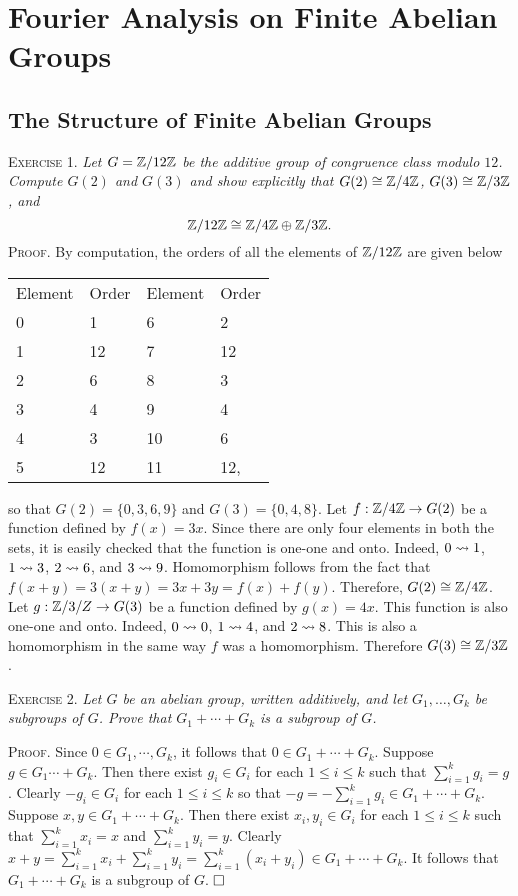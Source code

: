\documentclass[11pt, leqno]{article}
\newcommand{\done}{\ensuremath{\hfill\square}}
\begin{document}
\clearpage
\section{Fourier Analysis on Finite Abelian Groups}

\subsection{The Structure of Finite Abelian Groups}

\textsc{Exercise 1}. \emph{Let $G = \mathbb{Z}/12\mathbb{Z}$ be the additive group of congruence class modulo $12$. Compute $G(2)$ and $G(3)$ and show explicitly that $G(2) \cong \mathbb{Z}/4\mathbb{Z}$, $G(3) \cong \mathbb{Z}/3\mathbb{Z}$, and 
\begin{displaymath}
\mathbb{Z}/12\mathbb{Z} \cong \mathbb{Z}/4\mathbb{Z} \oplus \mathbb{Z}/3\mathbb{Z}.
\end{displaymath} }\textsc{Proof}. By computation, the orders of all the elements of $\mathbb{Z}/12\mathbb{Z}$ are given below
\begin{longtable}{p{4em} p{4em} p{4em} p{4em}}
  Element & Order & Element & Order \\
  0 & 1 & 6 & 2 \\
  1 & 12 & 7 & 12 \\
  2 & 6 & 8 & 3 \\
  3 & 4 & 9 & 4 \\
  4 & 3 & 10 & 6 \\
  5 & 12 & 11 & 12,
\end{longtable}\reduce
so that $G(2) = \{0, 3, 6, 9\}$ and $G(3) = \{0, 4, 8\}$. Let $f : \mathbb{Z}/4\mathbb{Z} \to G(2)$ be a function defined by $f(x) = 3x$. Since there are only four elements in both the sets, it is easily checked that the function is one-one and onto. Indeed, $0 \rightsquigarrow 1$, $1 \rightsquigarrow 3$, $2 \rightsquigarrow 6$, and $3 \rightsquigarrow 9$. Homomorphism follows from the fact that $f(x+y) = 3(x+y) = 3x + 3y = f(x) + f(y)$. Therefore, $G(2) \cong \mathbb{Z}/4\mathbb{Z}$. Let $g : \mathbb{Z}/3/Z \to G(3)$ be a function defined by $g(x) = 4x$. This function is also one-one and onto. Indeed, $0 \rightsquigarrow 0$, $1 \rightsquigarrow 4$, and $2 \rightsquigarrow 8$. This is also a homomorphism in the same way $f$ was a homomorphism. Therefore $G(3) \cong \mathbb{Z}/3\mathbb{Z}$.

\textsc{Exercise 2}. \emph{Let $G$ be an abelian group, written additively, and let $G_1, \ldots, G_k$ be subgroups of $G$. Prove that $G_1 + \cdots + G_k$ is a subgroup of $G$.}

\textsc{Proof}. Since $0 \in G_1, \cdots, G_k$, it follows that $0 \in G_1 + \cdots + G_k$. Suppose $g \in G_1 \cdots + G_k$. Then there exist $g_i \in G_i$ for each $1 \leq i \leq k$ such that $\sum_{i=1}^k g_i = g$. Clearly $-g_i \in G_i$ for each $1 \leq i \leq k$ so that $-g = -\sum_{i=1}^k g_i \in G_1 + \cdots + G_k$. Suppose $x, y \in G_1 + \cdots + G_k$. Then there exist $x_i, y_i \in G_i$ for each $1 \leq i \leq k$ such that $\sum_{i=1}^k x_i = x$ and $\sum_{i=1}^k y_i = y$. Clearly $x + y = \sum_{i=1}^k x_i + \sum_{i=1}^k y_i = \sum_{i=1}^k (x_i + y_i) \in G_1 + \cdots + G_k$. It follows that $G_1 + \cdots + G_k$ is a subgroup of $G$. \done
\end{document}
